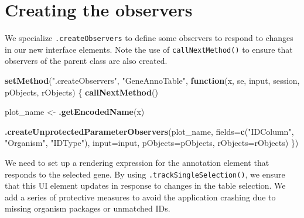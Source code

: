 \documentclass[
]{book}
\newenvironment{Shaded}{\begin{snugshade}}{\end{snugshade}}
\newcommand{\ControlFlowTok}[1]{\textcolor[rgb]{0.13,0.29,0.53}{\textbf{#1}}}
\newcommand{\DataTypeTok}[1]{\textcolor[rgb]{0.13,0.29,0.53}{#1}}
\newcommand{\KeywordTok}[1]{\textcolor[rgb]{0.13,0.29,0.53}{\textbf{#1}}}
\newcommand{\NormalTok}[1]{#1}
\newcommand{\StringTok}[1]{\textcolor[rgb]{0.31,0.60,0.02}{#1}}
\begin{document}
\hypertarget{creating-the-observers}{%
\section{Creating the observers}\label{creating-the-observers}}

We specialize \texttt{.createObservers} to define some observers to respond to changes in our new interface elements.
Note the use of \texttt{callNextMethod()} to ensure that observers of the parent class are also created.

\begin{Shaded}
\begin{Highlighting}[]
\KeywordTok{setMethod}\NormalTok{(}\StringTok{".createObservers"}\NormalTok{, }\StringTok{"GeneAnnoTable"}\NormalTok{,}
    \ControlFlowTok{function}\NormalTok{(x, se, input, session, pObjects, rObjects)}
\NormalTok{\{}
    \KeywordTok{callNextMethod}\NormalTok{()}

\NormalTok{    plot_name <-}\StringTok{ }\KeywordTok{.getEncodedName}\NormalTok{(x)}

    \KeywordTok{.createUnprotectedParameterObservers}\NormalTok{(plot_name,}
        \DataTypeTok{fields=}\KeywordTok{c}\NormalTok{(}\StringTok{"IDColumn"}\NormalTok{, }\StringTok{"Organism"}\NormalTok{, }\StringTok{"IDType"}\NormalTok{), }
        \DataTypeTok{input=}\NormalTok{input, }\DataTypeTok{pObjects=}\NormalTok{pObjects, }\DataTypeTok{rObjects=}\NormalTok{rObjects)}
\NormalTok{\})}
\end{Highlighting}
\end{Shaded}

We need to set up a rendering expression for the annotation element that responds to the selected gene.
By using \texttt{.trackSingleSelection()}, we ensure that this UI element updates in response to changes in the table selection.
We add a series of protective measures to avoid the application crashing due to missing organism packages or unmatched IDs.
\end{document}
